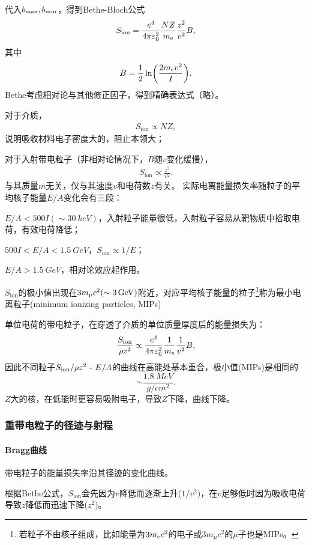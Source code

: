 代入$b_\mathrm{max},b_\mathrm{min}$，得到Bethe-Bloch公式
\begin{align}\label{Bethe-formula}
	S_{\mathrm{ion}}=\frac{e^4}{4\pi\varepsilon_0^2}\frac{NZ}{m_\mathrm e}\frac{z^2}{v^2}B,
\end{align}
其中 
\[
	B=\frac12\ln\biggl(\frac{2m_\mathrm e v^2}I\biggr).
\]
Bethe考虑相对论与其他修正因子，得到精确表达式（略）。


对于介质，
\begin{align}
	S_{\mathrm{ion}}\propto NZ,
\end{align}
说明吸收材料电子密度大的，阻止本领大；

对于入射带电粒子（非相对论情况下，$B$随$v$变化缓慢），
\begin{align}
	S_{\mathrm{ion}}\propto\frac{z^2}{v^2}.
\end{align}
与其质量$m$无关，仅与其速度$v$和电荷数$z$有关。
\newpage
实际电离能量损失率随粒子的平均核子能量$E/A$变化会有三段：
\begin{compactenum}
	\item $E/A<500I(\sim\SI{30}{keV})$，入射粒子能量很低，入射粒子容易从靶物质中拾取电荷，有效电荷降低；
	\item $500I<E/A<\SI{1.5}{GeV}$，$S_{\mathrm{ion}}\propto1/E$；
	\item $E/A>\SI{1.5}{GeV}$，相对论效应起作用。
\end{compactenum}
$S_{\mathrm{ion}}$的极小值出现在$3m_\mathrm p c^2(\sim\SI{3}{GeV})$附近，对应平均核子能量的粒子\footnote{若粒子不由核子组成，比如能量为$3m_\mathrm e c^2$的电子或$3m_\mu c^2$的$\mu$子也是MIPs。}称为最小电离粒子(minimum ionizing particles, MIPs)

单位电荷的带电粒子，在穿透了介质的单位质量厚度后的能量损失为：
\[
	\frac{S_{\mathrm{ion}}}{\rho z^2}\propto\frac{e^4}{4\pi\varepsilon_0^2}\frac{1}{m_\mathrm e}\frac{1}{v^2}B,
\]
因此不同粒子$S_{\mathrm{ion}}/\rho z^2~\text{-}~ E/A$的曲线在高能处基本重合，极小值(MIPs)是相同的
\[
	\sim\frac{\SI{1.8}{MeV}}{\si{g/cm^2}}.
\]
$Z$大的核，在低能时更容易吸附电子，导致$Z$下降，曲线下降。
\subsubsection{重带电粒子的径迹与射程}
\paragraph{Bragg曲线}带电粒子的能量损失率沿其径迹的变化曲线。

根据Bethe公式，$S_{\mathrm{ion}}$会先因为$v$降低而逐渐上升($1/v^2$)，在$v$足够低时因为吸收电荷导致$z$降低而迅速下降($z^2$)。


